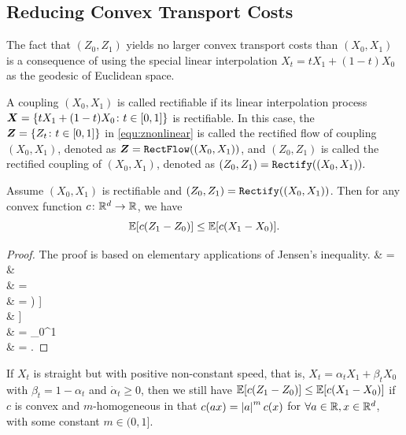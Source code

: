 \subsection{Reducing Convex Transport Costs}
\label{sec:cost}
The fact that $(Z_0,Z_1)$ yields no larger convex transport costs than $(X_0,X_1)$ 
is a consequence of using the special linear interpolation $X_t = t X_1 + (1-t)X_0$ as the geodesic of Euclidean space. 

\begin{mydef}
A coupling $(X_0,X_1)$ is called rectifiable if its linear interpolation process ${\boldsymbol{X}} = \{tX_1+(1-t)X_0\colon t\in[0,1]\}$ is rectifiable. 
In this case, the 
${\boldsymbol{Z}}=\{Z_t\colon t \in[0,1]\}$ in 
\eqref{equ:znonlinear} is called the 
rectified flow of coupling $(X_0,X_1)$, denoted as ${\boldsymbol{Z}} = \mathtt{RectFlow}((X_0,X_1))$, 
and $(Z_0,Z_1)$ is called the rectified coupling of $(X_0,X_1)$, denoted as $(Z_0,Z_1) = \mathtt{Rectify}((X_0,X_1)).$
\end{mydef}



\begin{thm} \label{thm:cost}
Assume $(X_0,X_1)$ is rectifiable and $(Z_0,Z_1) = \mathtt{Rectify}((X_0,X_1))$. 
Then for any convex function $c\colon \mathbb{R}^d\to \mathbb{R}$, we have 
$$\mathbb{E}[c(Z_1 - Z_0)] \leq \mathbb{E}[c(X_1 - X_0)].$$ 
\end{thm} 
\begin{proof} 
The proof is based on elementary applications of Jensen's inequality. 
\bb
\E\left [c(Z_1 - Z_0)\right]
& = \E {}  \\
&\leq \E {}  \\
& = \E {}  \\
& =  \E \left[ \int_0^1 c\left ( \E\left [(X_1-X_0)~|~X_t \right ] \right) \dt \right ] \\
& \leq  \E \left[ \int_0^1  \E\left [ c\left(X_1-X_0 \right) |~X_t \right ]   \dt \right ] \\
& = \int_0^1\E{} \dt  \ant{$\E[\E[(X_1-X_0) | X_t]] = \E[(X_1-X_0)]$}\\
& = \E{}. 
\ee 
\end{proof} 
 If $X_t$ is straight but with positive non-constant speed, that is, 
$X_t = \alpha_t X_1 + \beta_t X_0$ with $\beta_t = 1-\alpha_t$ and $\dot \alpha_t\geq0$, 
then we still have $\mathbb{E}[c(Z_1-Z_0)] \leq \mathbb{E}[c(X_1-X_0)]$ 
if $c$ is convex and $m$-homogeneous in that $c(a x) = \left\lvert a\right\rvert^m c(x)$ 
for $\forall a\in \mathbb{R}, x\in \mathbb{R}^d$, with 
some constant $m\in(0, 1]$. 
 





